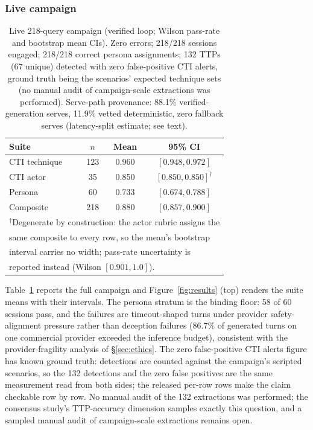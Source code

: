 \subsubsection{Live campaign}
\begin{table}[t]
\centering
\caption{Live 218-query campaign (verified loop; Wilson pass-rate and
bootstrap mean CIs). Zero errors; 218/218 sessions engaged; 218/218
correct persona assignments; 132 TTPs (67 unique) detected with zero
false-positive CTI alerts, ground truth being the scenarios' expected
technique sets (no manual audit of campaign-scale extractions was
performed). Serve-path provenance: 88.1\% verified-generation serves,
11.9\% vetted deterministic, zero fallback serves (latency-split
estimate; see text).}
\label{tab:live}
\begin{tabular}{lccc}
\toprule
Suite & $n$ & Mean & 95\% CI \\
\midrule
CTI technique & 123 & 0.960 & $[0.948, 0.972]$ \\
CTI actor     & 35  & 0.850 & $[0.850, 0.850]^\dagger$ \\
Persona       & 60  & 0.733 & $[0.674, 0.788]$ \\
\midrule
Composite     & 218 & 0.880 & $[0.857, 0.900]$ \\
\bottomrule
\multicolumn{4}{l}{\footnotesize $^\dagger$Degenerate by construction: the actor rubric assigns the} \\
\multicolumn{4}{l}{\footnotesize same composite to every row, so the mean's bootstrap} \\
\multicolumn{4}{l}{\footnotesize interval carries no width; pass-rate uncertainty is} \\
\multicolumn{4}{l}{\footnotesize reported instead (Wilson $[0.901, 1.0]$).} \\
\end{tabular}
\end{table}
Table~\ref{tab:live} reports the full campaign and
Figure~\ref{fig:results} (top) renders the suite means with their
intervals. The persona stratum is the binding floor: 58 of 60 sessions
pass, and the failures are timeout-shaped turns under provider
safety-alignment pressure rather than deception failures (86.7\% of
generated turns on one commercial provider exceeded the inference
budget), consistent with the provider-fragility analysis of
\S\ref{sec:ethics}. The zero false-positive CTI alerts figure has known
ground truth: detections are counted against the campaign's scripted
scenarios, so the 132 detections and the zero false positives are the
same measurement read from both sides; the released per-row rows make the
claim checkable row by row. No manual audit of the 132 extractions was
performed; the consensus study's TTP-accuracy dimension samples exactly
this question, and a sampled manual audit of campaign-scale extractions
remains open.

